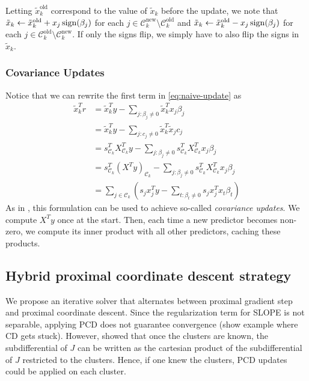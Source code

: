 Letting \(\tilde x_k^\text{old}\) correspond to the value of \(\tilde x_k\) before the update, we note that \(\tilde x_k \gets \tilde x_k^\text{old} + x_j \operatorname{sign}(\beta_j)\) for each \(j \in \mathcal{C}_k^\text{new} \setminus \mathcal{C}_k^\text{old}\) and \(\tilde x_k \gets \tilde x_k^\text{old} - x_j \operatorname{sign}(\beta_j)\) for each \(j \in \mathcal{C}_k^\text{old} \setminus \mathcal{C}_k^\text{new}\).
If only the signs flip, we simply have to also flip the signs in \(\tilde x_k\).

\subsubsection{Covariance Updates}

Notice that we can rewrite the first term in \eqref{eq:naive-update} as
\begin{equation}
  \begin{aligned}
    \tilde x_k^T r & = \tilde x_k^T y - \sum_{j : \beta_j \neq 0} \tilde x_k^T x_j \beta_j                                                                    \\
                   & = \tilde x_k^T y - \sum_{j : c_j \neq 0} \tilde x_k^T \tilde x_j c_j                                                                     \\
                   & = s_{\mathcal{C}_k}^T X_{\mathcal{C}_k}^T y - \sum_{j : \beta_j \neq 0} s_{\mathcal{C}_k}^T X_{\mathcal{C}_k}^T x_j \beta_j              \\
                   & = s_{\mathcal{C}_k}^T \left(X^T y\right)_{\mathcal{C}_k} - \sum_{j : \beta_j \neq 0} s_{\mathcal{C}_k}^T X_{\mathcal{C}_k}^T x_j \beta_j \\
                   & = \sum_{j \in \mathcal{C}_k}\left( s_j x_j^Ty - \sum_{t : \beta_t \neq 0} s_j x_j^T x_t \beta_t \right)
  \end{aligned}
\end{equation}
As in \textcite{friedman2010}, this formulation can be used to achieve so-called \emph{covariance updates}.
We compute \(X^T y\) once at the start.
Then, each time a new predictor becomes non-zero, we compute its inner product with all other predictors, caching these products.

\subsection{Hybrid proximal coordinate descent strategy}

We propose an iterative solver that alternates between proximal gradient step and proximal coordinate descent.
Since the regularization term for SLOPE is not separable, applying PCD does not guarantee convergence (show example where CD gets stuck).
However, \cite{dupuis2021} showed that once the clusters are known, the subdifferential of $J$ can be written as the cartesian product of the subdifferential of $J$ restricted to the clusters.
Hence, if one knew the clusters, PCD updates could be applied on each cluster.

